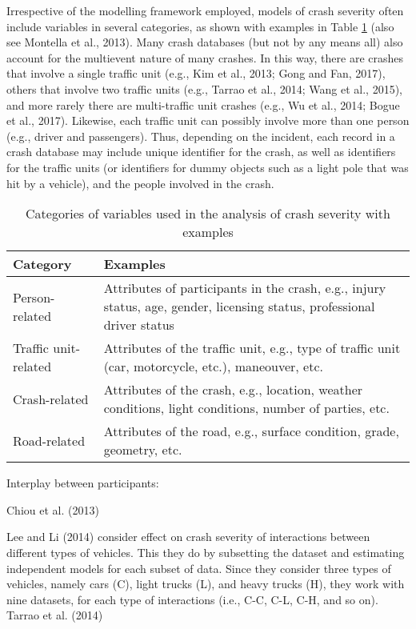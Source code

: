 \documentclass[]{elsarticle} %
\begin{document}
Irrespective of the modelling framework employed, models of crash
severity often include variables in several categories, as shown with
examples in Table \ref{tab:table-variable-categories} (also see Montella
et al., 2013). Many crash databases (but not by any means all) also
account for the multievent nature of many crashes. In this way, there
are crashes that involve a single traffic unit (e.g., Kim et al., 2013;
Gong and Fan, 2017), others that involve two traffic units (e.g., Tarrao
et al., 2014; Wang et al., 2015), and more rarely there are
multi-traffic unit crashes (e.g., Wu et al., 2014; Bogue et al., 2017).
Likewise, each traffic unit can possibly involve more than one person
(e.g., driver and passengers). Thus, depending on the incident, each
record in a crash database may include unique identifier for the crash,
as well as identifiers for the traffic units (or identifiers for dummy
objects such as a light pole that was hit by a vehicle), and the people
involved in the crash.

\begin{table}

\caption{\label{tab:table-variable-categories}\label{tab:table-variable-categories}Categories of variables used in the analysis of crash severity with examples}
\centering
\begin{tabular}[t]{l>{\raggedright\arraybackslash}p{22em}}
\toprule
Category & Examples\\
\midrule
Person-related & Attributes of participants in the crash, e.g., injury status, age, gender, licensing status, professional driver status\\
Traffic unit-related & Attributes of the traffic unit, e.g., type of traffic unit (car, motorcycle, etc.), maneouver, etc.\\
Crash-related & Attributes of the crash, e.g., location, weather conditions, light conditions, number of parties, etc.\\
Road-related & Attributes of the road, e.g., surface condition, grade, geometry, etc.\\
\bottomrule
\end{tabular}
\end{table}

Interplay between participants:

Chiou et al. (2013)

Lee and Li (2014) consider effect on crash severity of interactions
between different types of vehicles. This they do by subsetting the
dataset and estimating independent models for each subset of data. Since
they consider three types of vehicles, namely cars (C), light trucks
(L), and heavy trucks (H), they work with nine datasets, for each type
of interactions (i.e., C-C, C-L, C-H, and so on). Tarrao et al. (2014)
\end{document}
